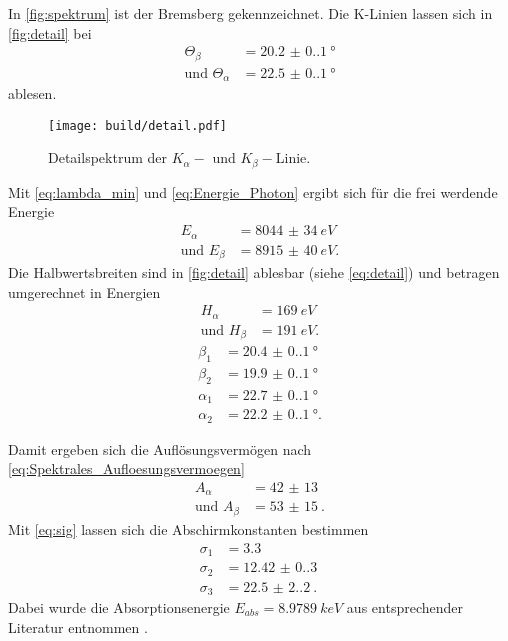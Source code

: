 In \autoref{fig:spektrum} ist der Bremsberg gekennzeichnet. Die K-Linien lassen sich in \autoref{fig:detail} bei 
\begin{align*}
  \Theta_{\beta} &= \SI{20.2(0.1)}{°} \\
  \text{und }\Theta_{\alpha} &= \SI{22.5(0.1)}{°}
\end{align*}
ablesen.
\begin{figure}[H]
  \texttt{[image: build/detail.pdf]}
  \caption{Detailspektrum der $K_{\alpha}-$ und $K_{\beta}-$Linie.}
  \label{fig:detail}
\end{figure}
Mit \autoref{eq:lambda_min} und \autoref{eq:Energie_Photon} ergibt sich für die frei werdende Energie
\begin{align*}
  E_{\alpha} &= \SI{8044(34)}{eV} \\
  \text{und }E_{\beta} &= \SI{8915(40)}{eV}.
\end{align*}
Die Halbwertsbreiten sind in \autoref{fig:detail} ablesbar (siehe \autoref{eq:detail}) und betragen umgerechnet in Energien
\begin{align*}
  H_{\alpha} &= \SI{169}{eV} \\
  \text{und }H_{\beta} &= \SI{191}{eV}.
\end{align*}
\begin{align}\label{eq:detail}
  \beta_1 &= \SI{20.4(0.1)}{°}\\
  \beta_2 &= \SI{19.9(0.1)}{°}\\
  \alpha_1 &= \SI{22.7(0.1)}{°}\\
  \alpha_2 &= \SI{22.2(0.1)}{°}.
\end{align}

Damit ergeben sich die Auflösungsvermögen nach \autoref{eq:Spektrales_Aufloesungsvermoegen}
\begin{align*}
  A_{\alpha} &= \SI{42(13)}{}\\
  \text{und }A_{\beta} &= \SI{53(15)}{}.
\end{align*}
Mit \autoref{eq:sig} lassen sich die Abschirmkonstanten bestimmen
\begin{align*}
  \sigma_1 &= 3.3\\
  \sigma_2 &= \SI{12.42(0.30)}{}\\
  \sigma_3 &= \SI{22.5(2.2)}{}.
\end{align*}
Dabei wurde die Absorptionsenergie $E_{abs} = \SI{8.9789}{keV}$ aus entsprechender Literatur entnommen \cite{E_abs}.


